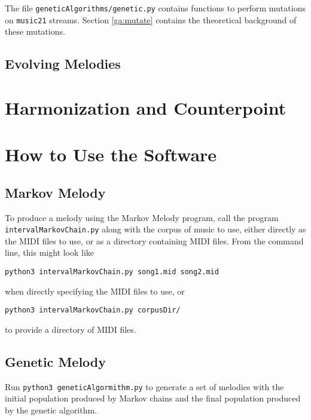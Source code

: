 The file \texttt{geneticAlgorithms/genetic.py} contains functions to perform mutations on \texttt{music21} streams.
Section \ref{ga:mutate} contains the theoretical background of these mutations.

\subsection{Evolving Melodies}



\section{Harmonization and Counterpoint}


\section{How to Use the Software}

\subsection{Markov Melody}

To produce a melody using the Markov Melody program, call the program \texttt{intervalMarkovChain.py} along with the corpus of music to use, either directly as the MIDI files to use, or as a directory containing MIDI files.
From the command line, this might look like

\texttt{python3 intervalMarkovChain.py song1.mid song2.mid}

\noindent when directly specifying the MIDI files to use, or

\texttt{python3 intervalMarkovChain.py corpusDir/}

\noindent to provide a directory of MIDI files.



\subsection{Genetic Melody}

Run \texttt{python3 geneticAlgormithm.py} to generate a set of melodies with the initial population produced by Markov chains and the final population produced by the genetic algorithm.
